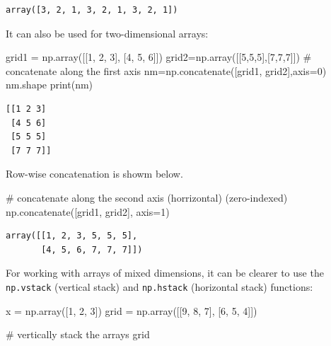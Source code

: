 \documentclass[
  letterpaper,
  DIV=11,
  numbers=noendperiod]{scrreprt}
\newenvironment{Shaded}{\begin{snugshade}}{\end{snugshade}}
\newcommand{\BuiltInTok}[1]{\textcolor[rgb]{0.00,0.23,0.31}{#1}}
\newcommand{\CommentTok}[1]{\textcolor[rgb]{0.37,0.37,0.37}{#1}}
\newcommand{\DecValTok}[1]{\textcolor[rgb]{0.68,0.00,0.00}{#1}}
\newcommand{\NormalTok}[1]{\textcolor[rgb]{0.00,0.23,0.31}{#1}}
\newcommand{\OperatorTok}[1]{\textcolor[rgb]{0.37,0.37,0.37}{#1}}
\theoremstyle{plain}
\theoremstyle{definition}
\theoremstyle{remark}
\begin{document}
\begin{verbatim}
array([3, 2, 1, 3, 2, 1, 3, 2, 1])
\end{verbatim}

It can also be used for two-dimensional arrays:

\begin{Shaded}
\begin{Highlighting}[]
\NormalTok{grid1 }\OperatorTok{=}\NormalTok{ np.array([[}\DecValTok{1}\NormalTok{, }\DecValTok{2}\NormalTok{, }\DecValTok{3}\NormalTok{],}
\NormalTok{                 [}\DecValTok{4}\NormalTok{, }\DecValTok{5}\NormalTok{, }\DecValTok{6}\NormalTok{]])}
\NormalTok{grid2}\OperatorTok{=}\NormalTok{np.array([[}\DecValTok{5}\NormalTok{,}\DecValTok{5}\NormalTok{,}\DecValTok{5}\NormalTok{],[}\DecValTok{7}\NormalTok{,}\DecValTok{7}\NormalTok{,}\DecValTok{7}\NormalTok{]])}
\CommentTok{\# concatenate along the first axis}
\NormalTok{nm}\OperatorTok{=}\NormalTok{np.concatenate([grid1, grid2],axis}\OperatorTok{=}\DecValTok{0}\NormalTok{)}
\NormalTok{nm.shape}
\BuiltInTok{print}\NormalTok{(nm)}
\end{Highlighting}
\end{Shaded}

\begin{verbatim}
[[1 2 3]
 [4 5 6]
 [5 5 5]
 [7 7 7]]
\end{verbatim}

Row-wise concatenation is showm below.

\begin{Shaded}
\begin{Highlighting}[]
\CommentTok{\# concatenate along the second axis (horrizontal) (zero{-}indexed)}
\NormalTok{np.concatenate([grid1, grid2], axis}\OperatorTok{=}\DecValTok{1}\NormalTok{)}
\end{Highlighting}
\end{Shaded}

\begin{verbatim}
array([[1, 2, 3, 5, 5, 5],
       [4, 5, 6, 7, 7, 7]])
\end{verbatim}

For working with arrays of mixed dimensions, it can be clearer to use
the \texttt{np.vstack} (vertical stack) and \texttt{np.hstack}
(horizontal stack) functions:

\begin{Shaded}
\begin{Highlighting}[]
\NormalTok{x }\OperatorTok{=}\NormalTok{ np.array([}\DecValTok{1}\NormalTok{, }\DecValTok{2}\NormalTok{, }\DecValTok{3}\NormalTok{])}
\NormalTok{grid }\OperatorTok{=}\NormalTok{ np.array([[}\DecValTok{9}\NormalTok{, }\DecValTok{8}\NormalTok{, }\DecValTok{7}\NormalTok{],}
\NormalTok{                 [}\DecValTok{6}\NormalTok{, }\DecValTok{5}\NormalTok{, }\DecValTok{4}\NormalTok{]])}

\CommentTok{\# vertically stack the arrays}
\NormalTok{grid}
\end{Highlighting}
\end{Shaded}
\end{document}
